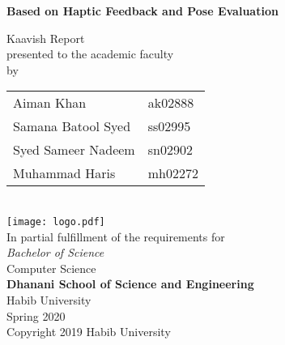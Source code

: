 \begin{titlepage}
  
  \begin{center}
    \vfill
    \textbf{\Huge \Title}
    
    \vspace{0.5cm}
    \textbf{\Large Based on Haptic Feedback and Pose Evaluation}
    \bigskip

    {\large Kaavish Report\\
      presented to the academic faculty\\
      by\\\bigskip
      \begin{tabular}{ll}
        Aiman Khan & ak02888\\
        Samana Batool Syed & ss02995\\
        Syed Sameer Nadeem & sn02902\\
        Muhammad Haris & mh02272\\
      \end{tabular}
    }\\\vfill
    \texttt{[image: logo.pdf]}\\
    {\large In partial fulfillment of the requirements for\\
      \textit{Bachelor of Science}\\
      Computer Science\\\medskip
      \textbf{Dhanani School of Science and Engineering}\\\medskip
      Habib University\\\smallskip
      Spring 2020
    }\\\vfill
    Copyright {\scriptsize \textcopyright} 2019 Habib University
  \end{center}
  \restoregeometry
\end{titlepage}

